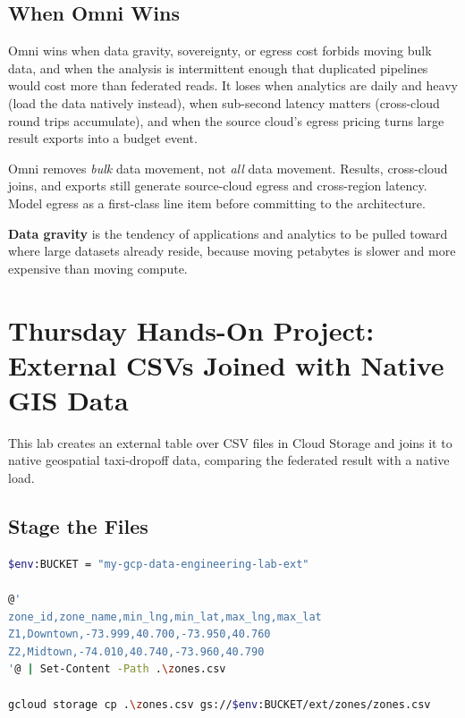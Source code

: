 \subsection{When Omni Wins}
Omni wins when data gravity, sovereignty, or egress cost forbids moving bulk data, and when the analysis is intermittent enough that duplicated pipelines would cost more than federated reads. It loses when analytics are daily and heavy (load the data natively instead), when sub-second latency matters (cross-cloud round trips accumulate), and when the source cloud's egress pricing turns large result exports into a budget event.

\begin{pitfall}
Omni removes \emph{bulk} data movement, not \emph{all} data movement. Results, cross-cloud joins, and exports still generate source-cloud egress and cross-region latency. Model egress as a first-class line item before committing to the architecture.
\end{pitfall}

\begin{definitionbox}
\textbf{Data gravity} is the tendency of applications and analytics to be pulled toward where large datasets already reside, because moving petabytes is slower and more expensive than moving compute.
\end{definitionbox}

\section{Thursday Hands-On Project: External CSVs Joined with Native GIS Data}
This lab creates an external table over CSV files in Cloud Storage and joins it to native geospatial taxi-dropoff data, comparing the federated result with a native load.

\subsection{Stage the Files}
\begin{lstlisting}[language=bash,caption={Creating sample zone CSVs and uploading them to Cloud Storage.}]
$env:BUCKET = "my-gcp-data-engineering-lab-ext"

@'
zone_id,zone_name,min_lng,min_lat,max_lng,max_lat
Z1,Downtown,-73.999,40.700,-73.950,40.760
Z2,Midtown,-74.010,40.740,-73.960,40.790
'@ | Set-Content -Path .\zones.csv

gcloud storage cp .\zones.csv gs://$env:BUCKET/ext/zones/zones.csv
\end{lstlisting}

